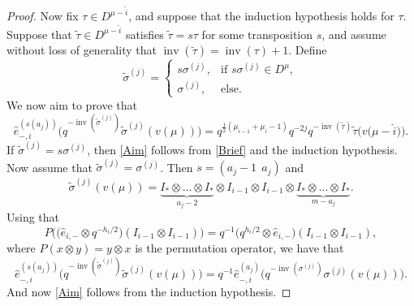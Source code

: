 \documentclass[11pt]{article}
\numberwithin{equation}{section}
\numberwithin{equation}{section}
\DeclareMathOperator{\inv}{inv}
\begin{document}
\begin{proof}
Now fix $\tau \in D^{\mu - \hat{i}}$, and suppose that the induction hypothesis holds for $\tau$. Suppose that $\tilde{\tau} \in D^{\mu - \hat{i}}$ satisfies $\tilde{\tau}=s\tau$ for some transposition $s$, and assume without loss of generality that $\inv(\tilde{\tau}) = \inv(\tau) + 1$. Define
\[
\tilde{\sigma}^{(j)}
=
\begin{cases}
s \sigma^{(j)}, & \text{if } s \sigma^{(j)} \in D^{\mu}, \\
\sigma^{(j)}, & \text{else. }
\end{cases}
\]
We now aim to prove that
\begin{equation}\label{Aim}
\hat{e}^{(s(a_j))}_{-,i}\big(q^{-\inv(\tilde{\sigma}^{(j)})} \tilde{\sigma}^{(j)}(v(\mu)) \big) = q^{\frac{1}{2}(\mu_{i-1}+\mu_i-1)} q^{-2j} q^{-\inv(\tilde{\tau})} \tilde{\tau}\big(v\big(\mu- \hat{i}\big)\big).
\end{equation}
If $\tilde{\sigma}^{(j)} = s\sigma^{(j)}$, then \eqref{Aim} follows from \eqref{Brief} and the induction hypothesis. Now assume that $\tilde{\sigma}^{(j)} = \sigma^{(j)}$. Then $s= (a_j-1 \ \ a_j)$ and
\[
\tilde{\sigma}^{(j)} ( v(\mu) ) = \underbrace{I_* \otimes \dots \otimes I_* }_{a_j-2} \otimes I_{i-1} \otimes I_{i-1} \otimes \underbrace{I_* \otimes \dots \otimes I_*}_{m-a_j}.
\]
Using that
\[
 P \big( \big(\hat{e}_{i,-} \otimes q^{-h_i/2}\big)(I_{i-1} \otimes I_{i-1}) \big) = q^{-1}\big(q^{h_i/2} \otimes \hat{e}_{i,-}\big)(I_{i-1} \otimes I_{i-1}) ,
\]
where $P(x\otimes y)=y\otimes x$ is the permutation operator, we have that
\[
\hat{e}^{(s(a_j))}_{-,i}\big(q^{-\inv(\tilde{\sigma}^{(j)})} \tilde{\sigma}^{(j)}(v(\mu)) \big) = q^{-1}\hat{e}^{(a_j)}_{-,i}\big(q^{-\inv({\sigma}^{(j)})} {\sigma}^{(j)}(v(\mu)) \big).
\]
And now \eqref{Aim} follows from the induction hypothesis.
\end{proof}
\end{document}
